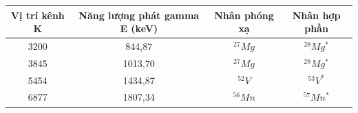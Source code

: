 \documentclass{article}
\begin{document}
\begin{table}[!ht]
    \centering
    \begin{tabular}{|c|c|c|c|}
    \hline
        Vị trí kênh K & Năng lượng phát gamma E (keV) & Nhân phóng xạ & Nhân hợp phần \\ \hline
        3200 & 844,87 & ${}^{27}Mg$ & ${}^{28}Mg^*$ \\ 
        3845 & 1013,70 & ${}^{27}Mg$ & ${}^{28}Mg^*$ \\ 
        5454 & 1434,87 & ${}^{52}V$ & ${}^{53}V^*$ \\ 
        6877 & 1807,34 & ${}^{56}Mn$ & ${}^{57}Mn^*$ \\ \hline
    \end{tabular}
\end{table}
\newpage
\clearpage\thispagestyle{empty}\addtocounter{page}{-1} 
\clearpage
\mbox{}
\newpage
\end{document}
